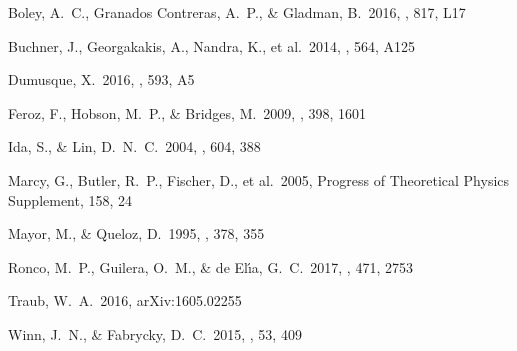 \documentclass[12pt,manuscript]{aastex}
\begin{document}
\begin{thebibliography}{}

 Boley, A.~C., Granados Contreras, A.~P., \& Gladman, B.\ 2016, \apjl, 817, L17 

 Buchner, J., Georgakakis, A., Nandra, K., et al.\ 2014, \aap, 564, A125

 Dumusque, X.\ 2016, \aap, 593, A5 

 Feroz, F., Hobson, M.~P., \& Bridges, M.\ 2009, \mnras, 398, 1601 

 Ida, S., \& Lin, D.~N.~C.\ 2004, \apj, 604, 388 

 Marcy, G., Butler, R.~P., Fischer, D., et al.\ 2005, Progress of Theoretical Physics Supplement, 158, 24

 Mayor, M., \& Queloz, D.\ 1995, \nat, 378, 355 

 Ronco, M.~P., Guilera, O.~M., \& de El{\'{\i}}a, G.~C.\ 2017, \mnras, 471, 2753 

 Traub, W.~A.\ 2016, arXiv:1605.02255 

 Winn, J.~N., \& Fabrycky, D.~C.\ 2015, \araa, 53, 409 

\end{thebibliography}

 
\end{document}
